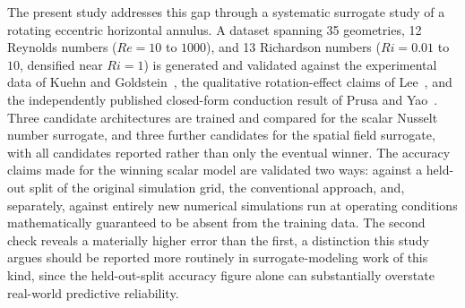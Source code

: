 The present study addresses this gap through a systematic surrogate study of a rotating eccentric horizontal annulus. A dataset spanning 35 geometries, 12 Reynolds numbers ($Re=10$ to $1000$), and 13 Richardson numbers ($Ri=0.01$ to $10$, densified near $Ri=1$) is generated and validated against the experimental data of Kuehn and Goldstein~\cite{KuehnGoldstein1978}, the qualitative rotation-effect claims of Lee~\cite{Lee1992a,Lee1992b}, and the independently published closed-form conduction result of Prusa and Yao~\cite{PrusaYao1983}. Three candidate architectures are trained and compared for the scalar Nusselt number surrogate, and three further candidates for the spatial field surrogate, with all candidates reported rather than only the eventual winner. The accuracy claims made for the winning scalar model are validated two ways: against a held-out split of the original simulation grid, the conventional approach, and, separately, against entirely new numerical simulations run at operating conditions mathematically guaranteed to be absent from the training data. The second check reveals a materially higher error than the first, a distinction this study argues should be reported more routinely in surrogate-modeling work of this kind, since the held-out-split accuracy figure alone can substantially overstate real-world predictive reliability.
